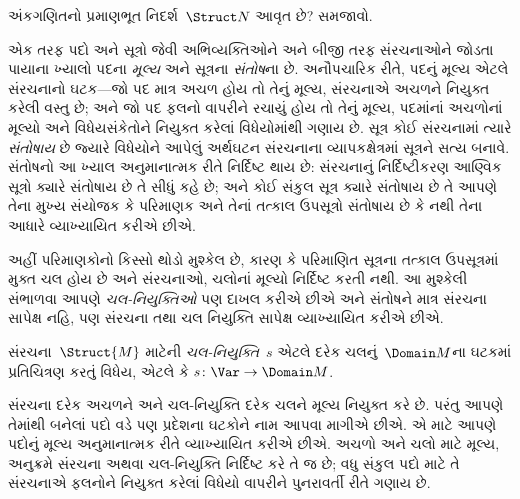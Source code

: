 \begin{prob}
અંકગણિતનો પ્રમાણભૂત નિદર્શ~$\Struct N$ આવૃત છે? સમજાવો.
\end{prob}
\endgroup


\begingroup
\makeatletter{}\makeatother


\label{guunit:OLP-0163}


\begin{explain}
એક તરફ પદો અને સૂત્રો જેવી અભિવ્યક્તિઓને અને બીજી તરફ
સંરચનાઓને જોડતા પાયાના ખ્યાલો પદના \emph{મૂલ્ય} અને
સૂત્રના \emph{સંતોષ}ના છે. અનૌપચારિક રીતે, પદનું મૂલ્ય
એટલે સંરચનાનો ઘટક---જો પદ માત્ર અચળ હોય તો તેનું
મૂલ્ય, સંરચનાએ અચળને નિયુક્ત કરેલી વસ્તુ છે; અને જો પદ
ફલનો વાપરીને રચાયું હોય તો તેનું મૂલ્ય, પદમાંનાં અચળોનાં
મૂલ્યો અને વિધેયસંકેતોને નિયુક્ત કરેલાં વિધેયોમાંથી ગણાય છે.
સૂત્ર કોઈ સંરચનામાં ત્યારે \emph{સંતોષાય} છે જ્યારે
વિધેયોને આપેલું અર્થઘટન સંરચનાના વ્યાપકક્ષેત્રમાં સૂત્રને સત્ય
બનાવે. સંતોષનો આ ખ્યાલ અનુમાનાત્મક રીતે નિર્દિષ્ટ થાય છે:
સંરચનાનું નિર્દિષ્ટીકરણ આણ્વિક સૂત્રો ક્યારે સંતોષાય છે તે
સીધું કહે છે; અને કોઈ સંકુલ સૂત્ર ક્યારે સંતોષાય છે તે આપણે તેના
મુખ્ય સંયોજક કે પરિમાણક અને તેનાં તત્કાલ ઉપસૂત્રો સંતોષાય છે કે
નથી તેના આધારે વ્યાખ્યાયિત કરીએ છીએ.

અહીં પરિમાણકોનો કિસ્સો થોડો મુશ્કેલ છે, કારણ કે પરિમાણિત
સૂત્રના તત્કાલ ઉપસૂત્રમાં મુક્ત ચલ હોય છે અને
સંરચનાઓ, ચલોનાં મૂલ્યો નિર્દિષ્ટ કરતી નથી. આ
મુશ્કેલી સંભાળવા આપણે \emph{ચલ-નિયુક્તિઓ} પણ દાખલ કરીએ છીએ અને સંતોષને
માત્ર સંરચના સાપેક્ષ નહિ, પણ સંરચના તથા
ચલ નિયુક્તિ સાપેક્ષ વ્યાખ્યાયિત કરીએ છીએ.
\end{explain}

\begin{defn}[ચલ-નિયુક્તિ]
સંરચના~$\Struct{M}$ માટેની \emph{ચલ-નિયુક્તિ}~$s$ એટલે દરેક
ચલનું~$\Domain M$ના ઘટકમાં પ્રતિચિત્રણ કરતું વિધેય,
એટલે કે $s\colon \Var \to \Domain M$.
\end{defn}

\begin{explain}
સંરચના દરેક અચળને અને ચલ-નિયુક્તિ દરેક ચલને
મૂલ્ય નિયુક્ત કરે છે. પરંતુ આપણે તેમાંથી બનેલાં પદો વડે પણ
પ્રદેશના ઘટકોને નામ આપવા માગીએ છીએ. એ માટે આપણે પદોનું
મૂલ્ય અનુમાનાત્મક રીતે વ્યાખ્યાયિત કરીએ છીએ. અચળો અને
ચલો માટે મૂલ્ય, અનુક્રમે સંરચના અથવા ચલ-નિયુક્તિ નિર્દિષ્ટ કરે
તે જ છે; વધુ સંકુલ પદો માટે તે સંરચનાએ ફલનોને નિયુક્ત
કરેલાં વિધેયો વાપરીને પુનરાવર્તી રીતે ગણાય છે.
\end{explain}

